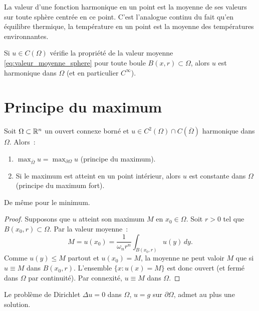 \begin{intuition}
La valeur d'une fonction harmonique en un point est la moyenne de ses
valeurs sur toute sph\`ere centr\'ee en ce point. C'est l'analogue continu
du fait qu'en \'equilibre thermique, la temp\'erature en un point est la
moyenne des temp\'eratures environnantes.
\end{intuition}

\begin{theoreme}
Si $u \in C(\Omega)$ v\'erifie la propri\'et\'e de la valeur moyenne
\eqref{eq:valeur_moyenne_sphere} pour toute boule $B(x,r) \subset \Omega$,
alors $u$ est harmonique dans $\Omega$ (et en particulier $C^\infty$).
\end{theoreme}

\section{Principe du maximum}

\begin{theoreme}
\label{thm:max_fort_harmonique}
Soit $\Omega \subset \mathbb{R}^n$ un ouvert connexe born\'e et $u \in C^2(\Omega) \cap C(\overline{\Omega})$
harmonique dans $\Omega$. Alors~:
\begin{enumerate}
    \item $\max_{\overline{\Omega}} u = \max_{\partial\Omega} u$
          (principe du maximum).
    \item Si le maximum est atteint en un point int\'erieur, alors $u$ est
          constante dans $\Omega$ (principe du maximum fort).
\end{enumerate}
De m\^eme pour le minimum.
\end{theoreme}

\begin{proof}
Supposons que $u$ atteint son maximum $M$ en $x_0 \in \Omega$. Soit
$r > 0$ tel que $B(x_0, r) \subset \Omega$. Par la valeur moyenne~:
\[
    M = u(x_0) = \frac{1}{\omega_n r^n}\int_{B(x_0,r)} u(y)\, dy.
\]
Comme $u(y) \leq M$ partout et $u(x_0) = M$, la moyenne ne peut valoir $M$
que si $u \equiv M$ dans $B(x_0,r)$. L'ensemble $\{x : u(x) = M\}$ est
donc ouvert (et ferm\'e dans $\Omega$ par continuit\'e). Par connexit\'e,
$u \equiv M$ dans $\Omega$.
\end{proof}

\begin{corollaire}
Le probl\`eme de Dirichlet $\Delta u = 0$ dans $\Omega$, $u = g$ sur
$\partial\Omega$, admet au plus une solution.
\end{corollaire}

